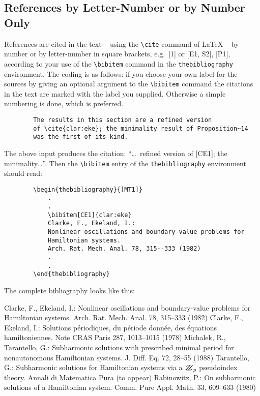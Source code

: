 \documentclass{llncs}
\begin{document}
    \subsection{References by Letter-Number or by Number Only}
    References are cited in the text -- using the \verb|\cite|
    command of \LaTeX{} -- by number or by letter-number in square
    brackets, e.g.\ [1] or [E1, S2], [P1], according to your use of the
    \verb|\bibitem| command in the \verb|thebibliography| environment. The
    coding is as follows: if you choose your own label for the sources by
    giving an optional argument to the \verb|\bibitem| command the citations
    in the text are marked with the label you supplied. Otherwise a simple
    numbering is done, which is preferred.
    \begin{verbatim}
        The results in this section are a refined version
        of \cite{clar:eke}; the minimality result of Proposition~14
        was the first of its kind.
    \end{verbatim}
    The above input produces the citation: ``\dots\ refined version of
    [CE1]; the min\-i\-mality\dots''. Then the \verb|\bibitem| entry of
    the \verb|thebibliography| environment should read:
    \begin{verbatim}
        \begin{thebibliography}{[MT1]}
            .
            .
            \bibitem[CE1]{clar:eke}
            Clarke, F., Ekeland, I.:
            Nonlinear oscillations and boundary-value problems for
            Hamiltonian systems.
            Arch. Rat. Mech. Anal. 78, 315--333 (1982)
            .
            .
        \end{thebibliography}
    \end{verbatim}
    The complete bibliography looks like this:
    \begin{thebibliography}{[MT1]}
        Clarke, F., Ekeland, I.:
        Nonlinear oscillations and
        boundary-value problems for Hamiltonian systems.
        Arch. Rat. Mech. Anal. 78, 315--333 (1982)
        Clarke, F., Ekeland, I.:
        Solutions p\'{e}riodiques, du
        p\'{e}riode donn\'{e}e, des \'{e}quations hamiltoniennes.
        Note CRAS Paris 287, 1013--1015 (1978)
        Michalek, R., Tarantello, G.:
        Subharmonic solutions with prescribed minimal
        period for nonautonomous Hamiltonian systems.
        J. Diff. Eq. 72, 28--55 (1988)
        Tarantello, G.:
        Subharmonic solutions for Hamiltonian
        systems via a $\bbbz_{p}$ pseudoindex theory.
        Annali di Matematica Pura (to appear)
        Rabinowitz, P.:
        On subharmonic solutions of a Hamiltonian system.
        Comm. Pure Appl. Math. 33, 609--633 (1980)
    \end{thebibliography}
\end{document}
